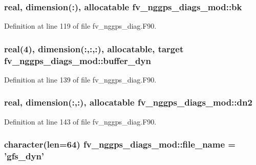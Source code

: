 \subsubsection[{bk}]{\setlength{\rightskip}{0pt plus 5cm}real, dimension(\-:), allocatable fv\-\_\-nggps\-\_\-diags\-\_\-mod\-::bk\hspace{0.3cm}{\ttfamily [private]}}\label{classfv__nggps__diags__mod_a3bfc67471e76aec3cec99058b20cd5a0}


Definition at line 119 of file fv\-\_\-nggps\-\_\-diag.\-F90.

\subsubsection[{buffer\-\_\-dyn}]{\setlength{\rightskip}{0pt plus 5cm}real(4), dimension(\-:,\-:,\-:), allocatable, target fv\-\_\-nggps\-\_\-diags\-\_\-mod\-::buffer\-\_\-dyn\hspace{0.3cm}{\ttfamily [private]}}\label{classfv__nggps__diags__mod_a5e8a9c5b4b5ad6df66de967461a3338b}


Definition at line 139 of file fv\-\_\-nggps\-\_\-diag.\-F90.

\subsubsection[{dn2}]{\setlength{\rightskip}{0pt plus 5cm}real, dimension(\-:,\-:), allocatable fv\-\_\-nggps\-\_\-diags\-\_\-mod\-::dn2\hspace{0.3cm}{\ttfamily [private]}}\label{classfv__nggps__diags__mod_a6eead80f8c1f8eb3e6d5c5e85856340e}


Definition at line 143 of file fv\-\_\-nggps\-\_\-diag.\-F90.

\subsubsection[{file\-\_\-name}]{\setlength{\rightskip}{0pt plus 5cm}character(len=64) fv\-\_\-nggps\-\_\-diags\-\_\-mod\-::file\-\_\-name = 'gfs\-\_\-dyn'\hspace{0.3cm}{\ttfamily [private]}}\label{classfv__nggps__diags__mod_a737e86420ad5d5b431a3117ce623e313}


